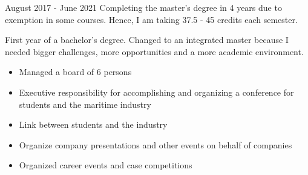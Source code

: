 

 {August 2017 - June 2021}{}
Completing the master's degree in 4 years due to exemption in some courses. Hence, I am taking 37.5 - 45 credits each semester.

\divider

First year of a bachelor's degree. Changed to an integrated master because I needed bigger challenges, more opportunities and a more academic environment.

\divider



\begin{itemize}
    \item Managed a board of 6 persons
    \item Executive responsibility for accomplishing and organizing a conference for students and the maritime industry
\end{itemize}

\divider

\begin{itemize}
    \item Link between students and the industry
    \item Organize company presentations and other events on behalf of companies
\end{itemize}

\divider

\begin{itemize}
    \item Organized career events and case competitions
\end{itemize}

